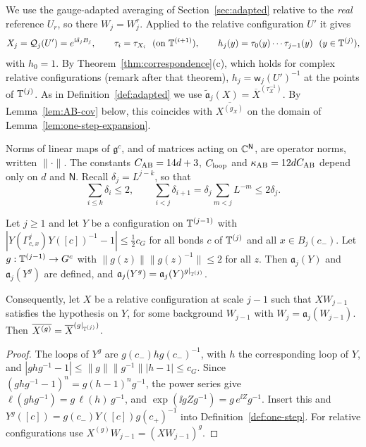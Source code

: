 We use the gauge-adapted averaging of Section~\ref{sec:adapted} relative to the \emph{real} reference $U_r$, so there $W_j=W^r_j$. Applied to the relative configuration $U'$ it gives
\[
X_j=\mathcal Q_j(U')=e^{\ii\delta_jB_j},\qquad \tau_i=\tau_{X_i}\ \ (\text{on }\T^{(i+1)}),\qquad h_j(y)=\tau_0(y)\cdots\tau_{j-1}(y)\ \ (y\in\T^{(j)}),
\]
with $h_0=1$. By Theorem~\ref{thm:correspondence}(c), which holds for complex relative configurations (remark after that theorem), $h_j=\mathsf w_j(U')^{-1}$ at the points of $\mathbb T^{(j)}$. As in Definition~\ref{def:adapted} we use $\tilde{\mathfrak a}_j(X)=\overline X^{(\tau_X^{-1})}$. By Lemma~\ref{lem:AB-cov} below, this coincides with $\overline{X^{(g_X)}}$ on the domain of Lemma~\ref{lem:one-step-expansion}.

Norms of linear maps of $\mathfrak g^c$, and of matrices acting on $\mathbb C^{\mathsf N}$, are operator norms, written $\|\cdot\|$. The constants $C_{\rm AB}=14d+3$, $C_{\rm loop}$ and $\kappa_{\rm AB}=12dC_{\rm AB}$ depend only on $d$ and $\mathsf N$. Recall $\delta_j=L^{j-k}$, so that
\begin{equation}\label{eq:AB-scales}
\sum_{i\le k}\delta_i\le2,\qquad\sum_{i<j}\delta_{i+1}=\delta_j\sum_{m<j}L^{-m}\le2\delta_j .
\end{equation}

\begin{lemma}\label{lem:AB-cov}
Let $j\ge1$ and let $Y$ be a configuration on $\mathbb T^{(j-1)}$ with $|Y(\Gamma^j_{c,x})Y([c])^{-1}-1|\le\frac12c_G$ for all bonds $c$ of $\mathbb T^{(j)}$ and all $x\in B_j(c_-)$. Let $g:\mathbb T^{(j-1)}\to G^c$ with $\|g(z)\|\|g(z)^{-1}\|\le2$ for all $z$. Then $\mathfrak a_j(Y)$ and $\mathfrak a_j(Y^g)$ are defined, and $\mathfrak a_j(Y^g)=\mathfrak a_j(Y)^{g|_{\mathbb T^{(j)}}}$.

Consequently, let $X$ be a relative configuration at scale $j-1$ such that $XW_{j-1}$ satisfies the hypothesis on $Y$, for some background $W_{j-1}$ with $W_j=\mathfrak a_j(W_{j-1})$. Then $\overline{X^{(g)}}=\overline X^{(g|_{\mathbb T^{(j)}})}$.
\end{lemma}

\begin{proof}
The loops of $Y^g$ are $g(c_-)hg(c_-)^{-1}$, with $h$ the corresponding loop of $Y$, and $|ghg^{-1}-1|\le\|g\|\|g^{-1}\||h-1|\le c_G$. Since $(ghg^{-1}-1)^n=g(h-1)^ng^{-1}$, the power series give $\ell(ghg^{-1})=g\,\ell(h)\,g^{-1}$, and $\exp(\ii gZg^{-1})=g\,e^{\ii Z}g^{-1}$. Insert this and $Y^g([c])=g(c_-)Y([c])g(c_+)^{-1}$ into Definition~\ref{def:one-step}. For relative configurations use $X^{(g)}W_{j-1}=(XW_{j-1})^g$.
\end{proof}

